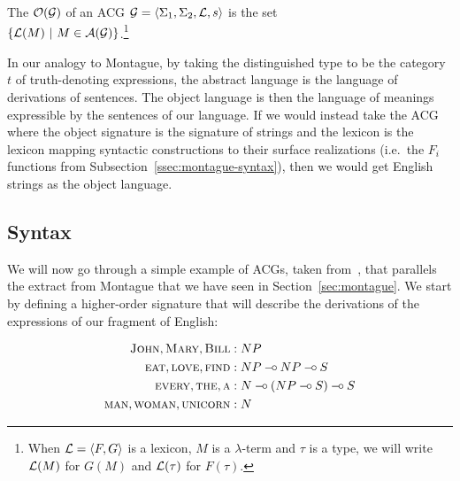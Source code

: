 \begin{definition}
  The  $\mathcal{O}(\mathcal{G})$ of an ACG
  $\mathcal{G} = \left< \Sigma_1, \Sigma_2, \mathcal{L}, s \right>$ is the set \\
  $\{ \mathcal{L}(M)\ |\ M \in \mathcal{A}(\mathcal{G}) \}$.\footnote{When
    $\mathcal{L} = \left< F, G \right>$ is a lexicon, $M$ is a $\lambda$-term and
    $\tau$ is a type, we will write $\mathcal{L}(M)$ for $G(M)$ and $\mathcal{L}(\tau)$ for
    $F(\tau)$.}
\end{definition}

In our analogy to Montague, by taking the distinguished type to be the
category $t$ of truth-denoting expressions, the abstract language is the
language of derivations of sentences. The object language is then the
language of meanings expressible by the sentences of our language. If we
would instead take the ACG where the object signature is the signature of
strings and the lexicon is the lexicon mapping syntactic constructions to
their surface realizations (i.e.\ the $F_i$ functions from
Subsection~\ref{ssec:montague-syntax}), then we would get English strings
as the object language.


\subsection{Syntax}
\label{ssec:acg-syntax}

We will now go through a simple example of ACGs, taken
from~\cite{pogodalla2007generalizing}, that parallels the extract from
Montague that we have seen in Section~\ref{sec:montague}. We start by
defining a higher-order signature that will describe the derivations of the
expressions of our fragment of English:

\begin{align*}
  \textsc{John}, \textsc{Mary}, \textsc{Bill} &: NP \\
  \textsc{eat}, \textsc{love}, \textsc{find} &: NP \mathbin{{-}\mkern-3.5mu{\circ}} NP \mathbin{{-}\mkern-3.5mu{\circ}} S \\
  \textsc{every}, \textsc{the}, \textsc{a} &: N \mathbin{{-}\mkern-3.5mu{\circ}} (NP \mathbin{{-}\mkern-3.5mu{\circ}} S) \mathbin{{-}\mkern-3.5mu{\circ}} S \\
  \textsc{man}, \textsc{woman}, \textsc{unicorn} &: N \\
\end{align*}

